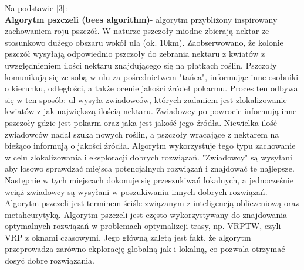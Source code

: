 \documentclass[a4paper, twoside, 12pt, justified]{article}
\begin{document}
	Na podstawie \hyperlink{bees}{[3]}:\\
	\textbf{Algorytm pszczeli (bees algorithm)}- algorytm przybliżony inspirowany zachowaniem roju pszczół. W naturze pszczoły miodne zbierają nektar ze stosunkowo dużego obszaru wokół ula (ok. 10km). Zaobserwowano, że kolonie pszczół wysyłają odpowiednio pszczoły do zebrania nektaru z kwiatów z uwzględnieniem ilości nektaru znajdującego się na płatkach roślin. Pszczoły komunikują się ze sobą w ulu za pośrednictwem "tańca", informując inne osobniki o kierunku, odległości, a także ocenie jakości źródeł pokarmu. Proces ten odbywa się w ten sposób: ul wysyła zwiadowców, których zadaniem jest zlokalizowanie kwiatów z jak największą ilością nektaru. Zwiadowcy po powrocie informują inne pszczoły gdzie jest pokarm oraz jaka jest jakość jego źródła. Niewielka ilość zwiadowców nadal szuka nowych roślin, a pszczoły wracające z nektarem na bieżąco informują o jakości źródła. Algorytm wykorzystuje tego typu zachowanie w celu zlokalizowania i eksploracji dobrych rozwiązań. "Zwiadowcy" są wysyłani aby losowo sprawdzać miejsca potencjalnych rozwiązań i znajdować te najlepsze. Następnie w tych miejscach dokonuje się przeszukiwań lokalnych, a jednocześnie wciąż zwiadowcy są wysyłani w poszukiwaniu innych dobrych rozwiązań.    
	Algorytm pszczeli jest terminem ściśle związanym z inteligencją obliczeniową oraz metaheurytyką. Algorytm pszczeli jest często wykorzystywany do znajdowania optymalnych rozwiązań w problemach optymalizcji trasy, np. VRPTW, czyli VRP z oknami czasowymi. Jego główną zaletą jest fakt, że algorytm przeprowadza zarówno ekplorację globalną jak i lokalną, co pozwala otrzymać dosyć dobre rozwiązania. \\
	
\end{document}
